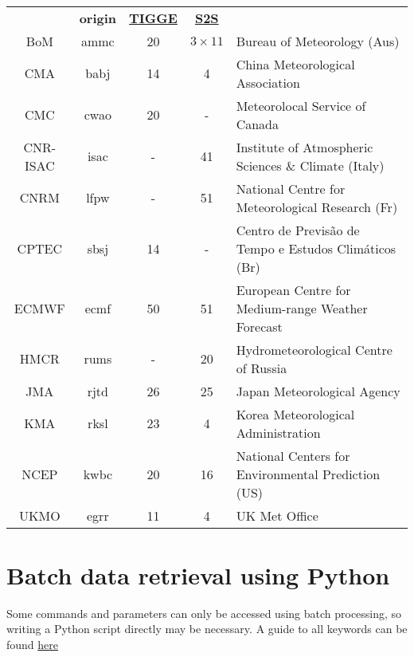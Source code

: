 \documentclass[10pt,fleqn]{article}
\begin{document}
\begin{framed}

 \\[10pt]
\begin{tabular}{c>{\ttfamily}cccl}
& \textbf{origin}& \textbf{\href{https://software.ecmwf.int/wiki/display/TIGGE/Models}{TIGGE}} & \textbf{\href{https://software.ecmwf.int/wiki/display/S2S/Models}{S2S}} & \\
BoM & ammc &20 &$3\times11$ & Bureau of Meteorology (Aus) \\
CMA & babj &14 &4 & China Meteorological Association \\
CMC & cwao &20 &-& Meteorolocal Service of Canada \\
CNR-ISAC & isac &-&41 & Institute of Atmospheric Sciences \& Climate (Italy)\\
CNRM & lfpw &-&51 & National Centre for Meteorological Research (Fr)\\
CPTEC & sbsj &14 &-& Centro de Previs\~{a}o de Tempo e Estudos Clim\'{a}ticos (Br) \\
ECMWF & ecmf &50 &51 &  European Centre for Medium-range Weather Forecast \\
HMCR & rums &-&20 & Hydrometeorological Centre of Russia\\
JMA & rjtd &26 &25 & Japan Meteorological Agency \\
KMA & rksl & 23 & 4 & Korea Meteorological Administration\\
NCEP & kwbc &20 &16 & National Centers for Environmental Prediction (US) \\
UKMO & egrr &11 &4 & UK Met Office\\
\end{tabular}

\end{framed}


\newpage

\section*{Batch data retrieval using Python}
Some commands and parameters can only be accessed using batch processing, so writing a Python script directly may be necessary. A guide to all keywords can be found \href{https://software.ecmwf.int/wiki/display/UDOC/Identification+keywords#Identificationkeywords-class}{here}\\[7pt]
\end{document}
